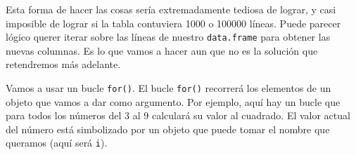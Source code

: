 \documentclass[
]{book}
\newenvironment{Shaded}{\begin{snugshade}}{\end{snugshade}}
\newcommand{\CommentTok}[1]{\textcolor[rgb]{0.56,0.35,0.01}{\textit{#1}}}
\newcommand{\ControlFlowTok}[1]{\textcolor[rgb]{0.13,0.29,0.53}{\textbf{#1}}}
\newcommand{\DecValTok}[1]{\textcolor[rgb]{0.00,0.00,0.81}{#1}}
\newcommand{\NormalTok}[1]{#1}
\newcommand{\OperatorTok}[1]{\textcolor[rgb]{0.81,0.36,0.00}{\textbf{#1}}}
\newcommand{\StringTok}[1]{\textcolor[rgb]{0.31,0.60,0.02}{#1}}
\begin{document}
\begin{Shaded}
\end{Shaded}

Esta forma de hacer las cosas sería extremadamente tediosa de lograr, y casi imposible de lograr si la tabla contuviera 1000 o 100000 líneas. Puede parecer lógico querer iterar sobre las líneas de nuestro \texttt{data.frame} para obtener las nuevas columnas. Es lo que vamos a hacer aun que no es la solución que retendremos más adelante.

Vamos a usar un bucle \texttt{for()}. El bucle \texttt{for()} recorrerá los elementos de un objeto que vamos a dar como argumento. Por ejemplo, aquí hay un bucle que para todos los números del 3 al 9 calculará su valor al cuadrado. El valor actual del número está simbolizado por un objeto que puede tomar el nombre que queramos (aquí será \texttt{i}).
\end{document}
